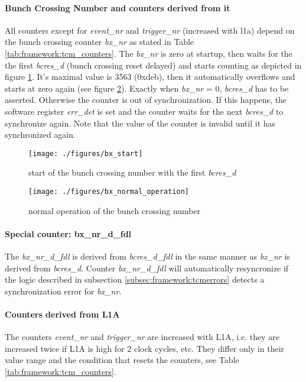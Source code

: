 \paragraph{Bunch Crossing Number and counters derived from it}
All counters except for \textit{event\_nr} and \textit{trigger\_nr} (increased with l1a) depend on the bunch crossing counter \textit{bx\_nr} as stated in Table \ref{tab:framework:tcm_counters}. The \textit{bx\_nr} is zero at startup, then waits for the the first \textit{bcres\_d} (bunch crossing reset delayed) and starts counting as depicted in figure \ref{fig:bx_start}. It's maximal value is 3563 (0xdeb), then it automatically overflows and starts at zero again (see figure \ref{fig:bx_normal_operation}). Exactly when \textit{bx\_nr} = 0, \textit{bcres\_d} has to be asserted. Otherwise the counter is out of synchronization. If this happens, the software register \textit{err\_det} is set and the counter waits for the next \textit{bcres\_d} to synchronize again. Note that the value of the counter is invalid until it has synchronized again.

\begin{figure}[ht]
  \texttt{[image: ./figures/bx\_start]}
  \caption{start of the bunch crossing number with the first \textit{bcres\_d}}
  \label{fig:bx_start}
\end{figure}

\begin{figure}[ht]
  \texttt{[image: ./figures/bx\_normal\_operation]}
  \caption{normal operation of the bunch crossing number}
  \label{fig:bx_normal_operation}
\end{figure}

\paragraph{Special counter: bx\_nr\_d\_fdl}
The \textit{bx\_nr\_d\_fdl} is derived from \textit{bcres\_d\_fdl} in the same manner as \textit{bx\_nr} is derived from \textit{bcres\_d}. Counter \textit{bx\_nr\_d\_fdl} will automatically resyncronize if the logic described in subsection \ref{subsec:framework:tcmerrors} detects a synchronization error for \textit{bx\_nr}.

\paragraph{Counters derived from L1A}
The counters \textit{event\_nr} and \textit{trigger\_nr} are increased with L1A, i.e. they are increased twice if L1A is high for 2 clock cycles, etc. They differ only in their value range and the condition that resets the counters, see Table \ref{tab:framework:tcm_counters}.

